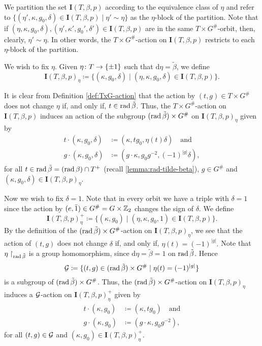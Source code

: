 We partition the set $\mathbf{I}(T, \beta, p)$ according to the equivalence class of $\eta$ and refer to $\{ (\eta', \kappa, g_0, \delta) \in \mathbf{I}(T, \beta, p) \mid \eta' \sim \eta \}$ as the $\eta$-block of the partition.
Note that if $(\eta, \kappa, g_0, \delta), (\eta', \kappa', g_0', \delta') \in \mathbf{I}(T, \beta, p)$ are in the same $T\times G^\#$-orbit, then, clearly, $\eta' \sim \eta$.
In other words, the $T\times G^\#$-action on $\mathbf{I}(T, \beta, p)$ restricts to each $\eta$-block of the partition.

We wish to fix $\eta$.
Given $\eta\colon T \to \{ \pm 1 \}$ such that $\mathrm{d}\eta = \tilde\beta$,
we define
\[
	\mathbf{I}(T, \beta, p)_\eta \coloneqq \{ (\kappa, g_0, \delta) \mid (\eta, \kappa, g_0, \delta) \in \mathbf{I}(T, \beta, p)\}.
\]

It is clear from Definition \ref{def:TxG-action} that the action by $(t,g)\in T\times G^\#$ does not change $\eta$ if, and only if, $t\in \operatorname{rad} \tilde\beta$.
Thus, the $T\times G^\#$-action on $\mathbf{I}(T, \beta, p)$ induces an action of the subgroup $(\operatorname{rad} \tilde\beta) \times G^\#$ on $\mathbf{I}(T, \beta, p)_\eta$ given by
\begin{align}
	t \cdot (\kappa, g_0, \delta) & \coloneqq (\kappa, t g_0, \eta(t)\delta)
	\quad \text{and}                                                                          \\
	g \cdot (\kappa, g_0, \delta) & \coloneqq (g\cdot \kappa, g_0 g^{-2}, (-1)^{|g|} \delta),
\end{align}
for all $t\in \operatorname{rad} \tilde\beta = (\operatorname{rad} \beta) \cap T^+$ (recall \cref{lemma:rad-tilde-beta}), $g\in G^\#$ and $(\kappa, g_0, \delta) \in \mathbf{I}(T, \beta, p)_\eta$. 

Now we wish to fix $\delta = 1$.
Note that in every orbit we have a triple with $\delta = 1$ since the action by $(e, \bar1) \in G^\# = G \times \mathbb{Z}_2$ changes the sign of $\delta$.
We define
\[\label{eq:I-eta-plus}
	\mathbf{I}(T, \beta, p)_\eta^+ \coloneqq \{ (\kappa, g_0) \mid (\eta, \kappa, g_0, 1) \in \mathbf{I}(T, \beta, p) \}.
\]
By the definition of the $(\operatorname{rad} \tilde\beta) \times G^\#$-action on $\mathbf{I}(T, \beta, p)_\eta$, we see that the action of $(t,g)$ does not change $\delta$ if, and only if, $
	\eta(t) = (-1)^{|g|}.
$
Note that $\eta\restriction_{\operatorname{rad} \tilde\beta}$ is a group homomorphism, since $\mathrm{d}\eta = \tilde\beta = 1$ on $\operatorname{rad} \tilde\beta$.
Hence
\[\label{eq:mathcal-G}
	\mathcal G \coloneqq \{ (t,g) \in (\operatorname{rad} \tilde\beta) \times G^\# \mid \eta(t) = (-1)^{|g|} \}
\]
is a subgroup of $(\operatorname{rad} \tilde\beta) \times G^\#$.
Thus, the $(\operatorname{rad} \tilde\beta) \times G^\#$-action on $\mathbf{I}(T, \beta, p)_\eta$ induces a $\mathcal G$-action on $\mathbf{I}(T, \beta, p)_\eta^+$ given by
\begin{equation}\label{eq:mc-G-action}
\begin{split}
	t \cdot (\kappa, g_0) & \coloneqq (\kappa, t g_0)
	\quad \text{and} \\
	g \cdot (\kappa, g_0) & \coloneqq (g\cdot \kappa, g_0 g^{-2}),
\end{split}
\end{equation}
for all $(t, g)\in \mathcal G$ and $(\kappa, g_0) \in \mathbf{I}(T, \beta, p)_\eta^+$. 

